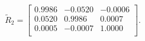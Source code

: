 \begin{equation*}
\widetilde{R}_{2} = 
\begin{bmatrix}
  0.9986 &  -0.0520 &  -0.0006 \\
  0.0520 &   0.9986 &   0.0007 \\
  0.0005 &  -0.0007 &   1.0000 \\
\end{bmatrix}.
\end{equation*}
